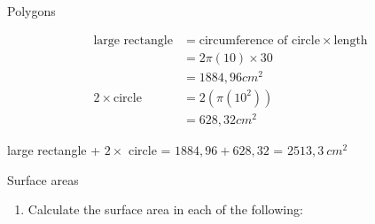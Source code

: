 \begin{exercises}{Polygons}
\begin{wex}
{

\begin{align*}
\mbox{large rectangle} &= \mbox{circumference of circle} \times \mbox{length} \\
                        &= 2\pi(10) \times 30 \\
                        &= 1884,96 cm^2 \\
       2\times \mbox{circle} &= 2(\pi(10^2)) \\
                             &= 628,32 cm^2
\end{align*}

large rectangle + $2\times$ circle = $1884,96 + 628,32$ = $2513,3~cm^2$


}
\end{wex}






\begin{exercises}{Surface areas }
            \nopagebreak
            
        \label{m39357*id62786}\begin{enumerate}[noitemsep, label=\textbf{\arabic*}. ] 
            \label{m39357*uid12}\item Calculate the surface area in each of the following:

    \setcounter{subfigure}{0}



\end{enumerate}
\end{exercises}
\end{exercises}
